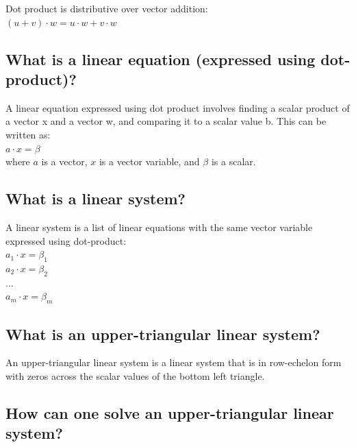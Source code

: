 \documentclass[
  letterpaper,
  DIV=11,
  numbers=noendperiod]{scrartcl}
\begin{document}
Dot product is distributive over vector addition:\\
\((u + v) \cdot w = u \cdot w + v \cdot w\)

\hypertarget{what-is-a-linear-equation-expressed-using-dot-product}{%
\subsection{What is a linear equation (expressed using
dot-product)?}\label{what-is-a-linear-equation-expressed-using-dot-product}}

A linear equation expressed using dot product involves finding a scalar
product of a vector x and a vector w, and comparing it to a scalar value
b. This can be written as:\\
\(a \cdot x = \beta\)\\
where \(a\) is a vector, \(x\) is a vector variable, and \(\beta\) is a
scalar.

\hypertarget{what-is-a-linear-system}{%
\subsection{What is a linear system?}\label{what-is-a-linear-system}}

A linear system is a list of linear equations with the same vector
variable expressed using dot-product:\\
\(a_1 \cdot x = \beta_1\)\\
\(a_2 \cdot x = \beta_2\)\\
\(...\)\\
\(a_m \cdot x = \beta_m\)

\hypertarget{what-is-an-upper-triangular-linear-system}{%
\subsection{What is an upper-triangular linear
system?}\label{what-is-an-upper-triangular-linear-system}}

An upper-triangular linear system is a linear system that is in
row-echelon form with zeros across the scalar values of the bottom left
triangle.

\hypertarget{how-can-one-solve-an-upper-triangular-linear-system}{%
\subsection{How can one solve an upper-triangular linear
system?}\label{how-can-one-solve-an-upper-triangular-linear-system}}
\end{document}
